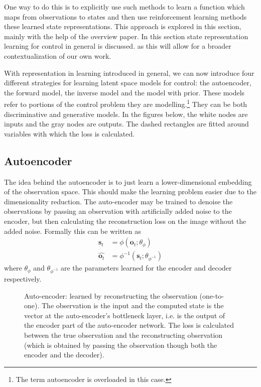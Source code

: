 One way to do this is to explicitly use such methods to learn 
a function which maps from observations to states
and then use reinforcement learning methods these learned state
representations.
This approach is explored in this section, mainly with the help
of the 
\cite{srloverview}
overview paper.
In this section  state representation learning for control in general is discussed.
as this will allow for a broader contextualization of our own work.


With representation in learning introduced in general,
we can now introduce four different strategies for learning latent space models for control:
the autoencoder, the forward model, the inverse model and the model
with prior.
These models refer to portions of the control problem they are modelling.\footnote{The term
autoencoder is overloaded in this case.}
They can be both discriminative and generative models.
In the figures below, the white nodes are inputs and the gray nodes are outputs.
The dashed rectangles are fitted around variables with which the loss is calculated.

\subsection{Autoencoder}
The idea behind the autoencoder is to just learn a lower-dimensional embedding
of the observation space. This should make the learning problem easier due to the
dimensionality reduction.
The auto-encoder may be trained to denoise the observations by passing an observation
with artificially added noise to the encoder, but then calculating the reconstruction
loss on the image without the added noise.
Formally this can be written as
\begin{align}
		\bm{s}_{t} &= \phi (\bm{o}_{t}; \theta_{ \phi }) \\
		\hat{\bm{o}_{t}} &= \phi^{ -1 } (\bm{s}_{t}; \theta_{ \phi^{ -1 } })
\end{align}
where $ \theta_{ \phi }  $ and
$ \theta_{ \phi^{ -1 } }  $ are the parameters learned for the encoder and decoder respectively.

\begin{figure}[htpb]
\begin{center}
\end{center}
		\caption{Auto-encoder: learned by reconstructing the observation (one-to-one).
				The observation is the input and the computed state is the vector at
				the auto-encoder's bottleneck layer, i.e. is the output of the encoder
				part of the auto-encoder network.
		The loss is calculated between the true observation and the reconstructing observation (which
		is obtained by passing the observation though both the encoder and the decoder).}
\end{figure}


